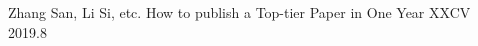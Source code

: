 

\begin{cventries}

  \cventry
    {Zhang San, Li Si, etc.} %
    {How to publish a Top-tier Paper in One Year} %
    {XXCV} %
    {2019.8} %
    {
    }

\end{cventries}
